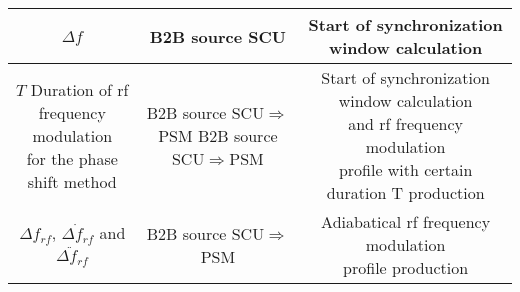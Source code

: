 \begin{landscape}
\begin{table}[!htb]
\begin{center}
\begin{tabular}{ | c | c | c |}
$\Delta f$ 											&		B2B source SCU	&Start of synchronization window calculation\\ \hline
$T$	 \tabincell{c}{Duration of rf\\ frequency modulation\\ for the phase shift method}												&		\tabincell{c}{B2B source SCU$\Rightarrow$PSM\\B2B source SCU$\Rightarrow$PSM}	&\tabincell{c}{Start of synchronization window calculation \\ and rf frequency modulation\\ profile with certain duration T production}\\ \hline
$\Delta f_{\mathit{rf}}$, $\dot{\Delta f_{\mathit{rf}}}$ and $\ddot{\Delta f_{\mathit{rf}}}$ & B2B source SCU$\Rightarrow$PSM&\tabincell{c}{ Adiabatical rf frequency modulation\\ profile production}\\ \hline

    \end{tabular}
\end{center}
\end{table}
\end{landscape} 